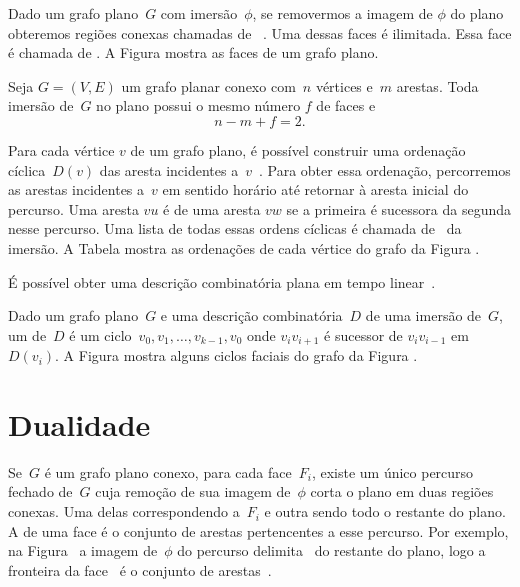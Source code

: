 Dado um grafo plano~$G$ com imersão~$\phi$, se removermos a imagem de $\phi$ do plano obteremos regiões conexas chamadas de ~\cite{planarTheoryAlgorith}.
Uma dessas faces é ilimitada.
Essa face é chamada de .
A Figura  mostra as faces de um grafo plano.


\begin{theorem}
\label{teo:MSFEuler}
Seja $G=(V,E)$ um grafo planar conexo com~$n$ vértices e~$m$ arestas. Toda imersão de~$G$ no plano possui o mesmo número $f$ de faces e
$$
n-m+f = 2.
$$
\end{theorem}

Para cada vértice $v$ de um grafo plano, é possível construir uma ordenação cíclica~$D(v)$ das aresta incidentes a~$v$~\cite{noma2003}.
Para obter essa ordenação, percorremos as arestas incidentes a~$v$ em sentido horário até retornar à aresta inicial do percurso.
Uma aresta $vu$ é  de uma aresta $vw$ se a primeira é sucessora da segunda nesse percurso.
Uma lista de todas essas ordens cíclicas é chamada de~ da imersão.
A Tabela  mostra as ordenações de cada vértice do grafo da Figura .

É possível obter uma descrição combinatória plana em tempo linear~.

Dado um grafo plano~$G$ e uma descrição combinatória~$D$ de uma imersão de~$G$, um  de~$D$ é um ciclo~$v_0,v_1,\ldots,v_{k-1},v_0$ onde $v_iv_{i+1}$ é sucessor de $v_iv_{i-1}$ em $D(v_i)$.
A Figura  mostra alguns ciclos faciais do grafo da Figura .

\section{Dualidade}

Se~$G$ é um grafo plano conexo, para cada face~$F_i$, existe um único percurso fechado de~$G$ cuja remoção de sua imagem de~$\phi$ corta o plano em duas regiões conexas.
Uma delas correspondendo a~$F_i$ e outra sendo todo o restante do plano.
A  de uma face é o conjunto de arestas pertencentes a esse percurso.
Por exemplo, na Figura~ a imagem de~$\phi$ do percurso  delimita~ do restante do plano, logo a fronteira da face~ é o conjunto de arestas~.

